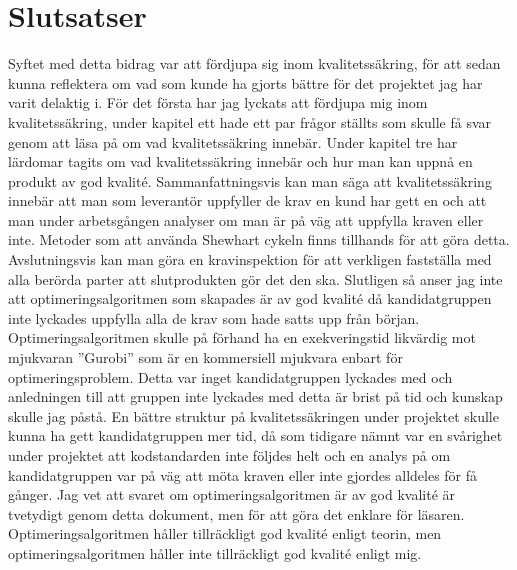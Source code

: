\section{Slutsatser}
Syftet med detta bidrag var att fördjupa sig inom kvalitetssäkring, för att sedan kunna reflektera om vad som kunde ha gjorts bättre för det projektet jag har varit delaktig i.
\newline
\newline
För det första har jag lyckats att fördjupa mig inom kvalitetssäkring, under kapitel ett hade ett par frågor ställts som skulle få svar genom att läsa på om vad kvalitetssäkring innebär. Under kapitel tre har lärdomar tagits om vad kvalitetssäkring innebär och hur man kan uppnå en produkt av god kvalité. Sammanfattningsvis kan man säga att kvalitetssäkring innebär att man som leverantör uppfyller de krav en kund har gett en och att man under arbetsgången analyser om man är på väg att uppfylla kraven eller inte. Metoder som att använda Shewhart cykeln finns tillhands för att göra detta. Avslutningsvis kan man göra en kravinspektion för att verkligen fastställa med alla berörda parter att slutprodukten gör det den ska.
\newline
\newline
Slutligen så anser jag inte att optimeringsalgoritmen som skapades är av god kvalité då kandidatgruppen inte lyckades uppfylla alla de krav som hade satts upp från början. Optimeringsalgoritmen skulle på förhand ha en exekveringstid likvärdig mot mjukvaran ''Gurobi'' som är en kommersiell mjukvara enbart för optimeringsproblem. Detta var inget kandidatgruppen lyckades med och anledningen till att gruppen inte lyckades med detta är brist på tid och kunskap skulle jag påstå. En bättre struktur på kvalitetssäkringen under projektet skulle kunna ha gett kandidatgruppen mer tid, då som tidigare nämnt var en svårighet under projektet att kodstandarden inte följdes helt och en analys på om kandidatgruppen var på väg att möta kraven eller inte gjordes alldeles för få gånger. Jag vet att svaret om optimeringsalgoritmen är av god kvalité är tvetydigt genom detta dokument, men för att göra det enklare för läsaren. Optimeringsalgoritmen håller tillräckligt god kvalité enligt teorin, men optimeringsalgoritmen håller inte tillräckligt god kvalité enligt mig.
